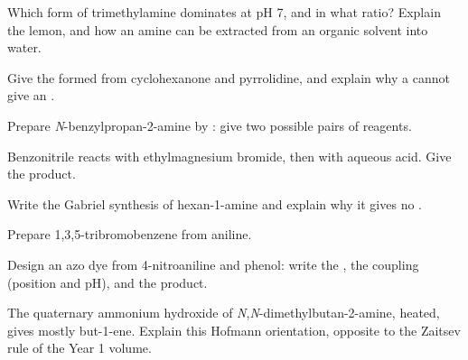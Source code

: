 \begin{exercise}[$\star\star$]\label{exo:b2:amines:5}
Which form of trimethylamine dominates at pH 7, and in what ratio? Explain the lemon, and how an
amine can be extracted from an organic solvent into water.
\end{exercise}

\begin{exercise}[$\star\star$]\label{exo:b2:amines:6}
Give the  formed from cyclohexanone and pyrrolidine, and explain why a 
cannot give an .
\end{exercise}

\begin{exercise}[$\star\star$]\label{exo:b2:amines:7}
Prepare \textit{N}-benzylpropan-2-amine  by : give two
possible pairs of reagents.
\end{exercise}

\begin{exercise}[$\star\star$]\label{exo:b2:amines:8}
Benzonitrile reacts with ethylmagnesium bromide, then with aqueous acid. Give the product.
\end{exercise}

\begin{exercise}[$\star\star$]\label{exo:b2:amines:9}
Write the Gabriel synthesis of hexan-1-amine and explain why it gives no .
\end{exercise}

\begin{exercise}[$\star\star\star$]\label{exo:b2:amines:10}
Prepare 1,3,5-tribromobenzene from aniline.
\end{exercise}

\begin{exercise}[$\star\star\star$]\label{exo:b2:amines:11}
Design an azo dye from 4-nitroaniline and phenol: write the , the coupling (position
and pH), and the product.
\end{exercise}

\begin{exercise}[$\star\star\star$]\label{exo:b2:amines:12}
The quaternary ammonium hydroxide of \textit{N},\textit{N}-dimethylbutan-2-amine, heated, gives
mostly but-1-ene. Explain this Hofmann orientation, opposite to the Zaitsev rule of the Year 1
volume.
\end{exercise}

